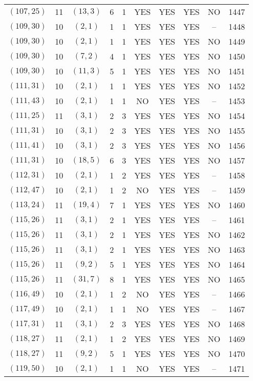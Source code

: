 \begin{longtable}{|c|c|c|c|c|c|c|c|c|c|}
$(107, 25)$ & 11 & $(13, 3)$ & 6 & 1 & YES & YES & YES & NO & 1447\\
$(109, 30)$ & 10 & $(2, 1)$ & 1 & 1 & YES & YES & YES & -- & 1448\\
$(109, 30)$ & 10 & $(2, 1)$ & 1 & 1 & YES & YES & YES & NO & 1449\\
$(109, 30)$ & 10 & $(7, 2)$ & 4 & 1 & YES & YES & YES & NO & 1450\\
$(109, 30)$ & 10 & $(11, 3)$ & 5 & 1 & YES & YES & YES & NO & 1451\\
$(111, 31)$ & 10 & $(2, 1)$ & 1 & 1 & YES & YES & YES & NO & 1452\\
$(111, 43)$ & 10 & $(2, 1)$ & 1 & 1 & NO & YES & YES & -- & 1453\\
$(111, 25)$ & 11 & $(3, 1)$ & 2 & 3 & YES & YES & YES & NO & 1454\\
$(111, 31)$ & 10 & $(3, 1)$ & 2 & 3 & YES & YES & YES & NO & 1455\\
$(111, 41)$ & 10 & $(3, 1)$ & 2 & 3 & YES & YES & YES & NO & 1456\\
$(111, 31)$ & 10 & $(18, 5)$ & 6 & 3 & YES & YES & YES & NO & 1457\\
$(112, 31)$ & 10 & $(2, 1)$ & 1 & 2 & YES & YES & YES & -- & 1458\\
$(112, 47)$ & 10 & $(2, 1)$ & 1 & 2 & NO & YES & YES & -- & 1459\\
$(113, 24)$ & 11 & $(19, 4)$ & 7 & 1 & YES & YES & YES & NO & 1460\\
$(115, 26)$ & 11 & $(3, 1)$ & 2 & 1 & YES & YES & YES & -- & 1461\\
$(115, 26)$ & 11 & $(3, 1)$ & 2 & 1 & YES & YES & YES & NO & 1462\\
$(115, 26)$ & 11 & $(3, 1)$ & 2 & 1 & YES & YES & YES & NO & 1463\\
$(115, 26)$ & 11 & $(9, 2)$ & 5 & 1 & YES & YES & YES & NO & 1464\\
$(115, 26)$ & 11 & $(31, 7)$ & 8 & 1 & YES & YES & YES & NO & 1465\\
$(116, 49)$ & 10 & $(2, 1)$ & 1 & 2 & NO & YES & YES & -- & 1466\\
$(117, 49)$ & 10 & $(2, 1)$ & 1 & 1 & NO & YES & YES & -- & 1467\\
$(117, 31)$ & 11 & $(3, 1)$ & 2 & 3 & YES & YES & YES & NO & 1468\\
$(118, 27)$ & 11 & $(2, 1)$ & 1 & 2 & YES & YES & YES & NO & 1469\\
$(118, 27)$ & 11 & $(9, 2)$ & 5 & 1 & YES & YES & YES & NO & 1470\\
$(119, 50)$ & 10 & $(2, 1)$ & 1 & 1 & NO & YES & YES & -- & 1471\\

\end{longtable}
